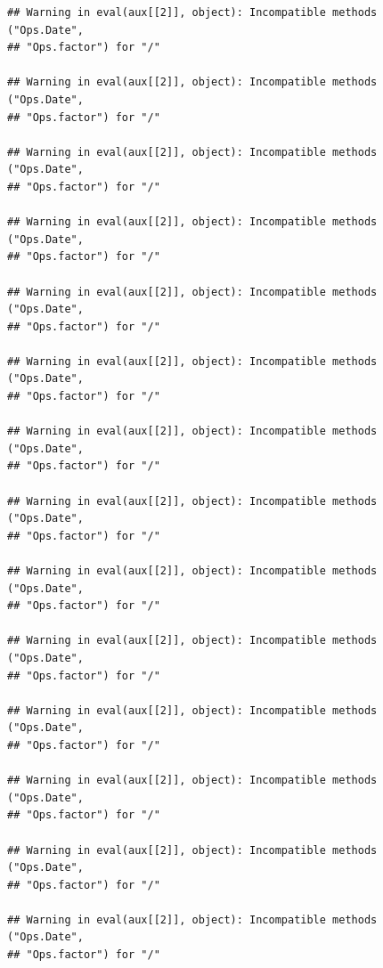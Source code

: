 \documentclass[12pt,]{article}
\newenvironment{Shaded}{\begin{snugshade}}{\end{snugshade}}
\newcommand{\KeywordTok}[1]{\textcolor[rgb]{0.13,0.29,0.53}{\textbf{#1}}}
\newcommand{\DataTypeTok}[1]{\textcolor[rgb]{0.13,0.29,0.53}{#1}}
\newcommand{\DecValTok}[1]{\textcolor[rgb]{0.00,0.00,0.81}{#1}}
\newcommand{\FloatTok}[1]{\textcolor[rgb]{0.00,0.00,0.81}{#1}}
\newcommand{\StringTok}[1]{\textcolor[rgb]{0.31,0.60,0.02}{#1}}
\newcommand{\CommentTok}[1]{\textcolor[rgb]{0.56,0.35,0.01}{\textit{#1}}}
\newcommand{\OperatorTok}[1]{\textcolor[rgb]{0.81,0.36,0.00}{\textbf{#1}}}
\newcommand{\NormalTok}[1]{#1}
\begin{document}
\begin{Shaded}
\end{Shaded}

\begin{verbatim}
## Warning in eval(aux[[2]], object): Incompatible methods ("Ops.Date",
## "Ops.factor") for "/"

## Warning in eval(aux[[2]], object): Incompatible methods ("Ops.Date",
## "Ops.factor") for "/"

## Warning in eval(aux[[2]], object): Incompatible methods ("Ops.Date",
## "Ops.factor") for "/"

## Warning in eval(aux[[2]], object): Incompatible methods ("Ops.Date",
## "Ops.factor") for "/"

## Warning in eval(aux[[2]], object): Incompatible methods ("Ops.Date",
## "Ops.factor") for "/"

## Warning in eval(aux[[2]], object): Incompatible methods ("Ops.Date",
## "Ops.factor") for "/"

## Warning in eval(aux[[2]], object): Incompatible methods ("Ops.Date",
## "Ops.factor") for "/"

## Warning in eval(aux[[2]], object): Incompatible methods ("Ops.Date",
## "Ops.factor") for "/"

## Warning in eval(aux[[2]], object): Incompatible methods ("Ops.Date",
## "Ops.factor") for "/"

## Warning in eval(aux[[2]], object): Incompatible methods ("Ops.Date",
## "Ops.factor") for "/"

## Warning in eval(aux[[2]], object): Incompatible methods ("Ops.Date",
## "Ops.factor") for "/"

## Warning in eval(aux[[2]], object): Incompatible methods ("Ops.Date",
## "Ops.factor") for "/"

## Warning in eval(aux[[2]], object): Incompatible methods ("Ops.Date",
## "Ops.factor") for "/"

## Warning in eval(aux[[2]], object): Incompatible methods ("Ops.Date",
## "Ops.factor") for "/"
\end{verbatim}
\end{document}
